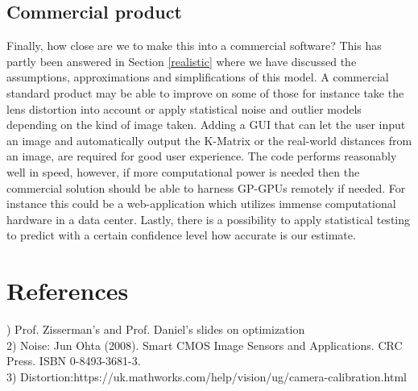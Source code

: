 \documentclass[titlepage]{article}
\begin{document}
\subsection{Commercial product}
Finally, how close are we to make this into a commercial software? This has partly been answered in Section \ref{realistic} where we have discussed the assumptions, approximations and simplifications of this model. A commercial standard product may be able to improve on some of those for instance take the lens distortion into account or apply statistical noise and outlier models depending on the kind of image taken. Adding a GUI that can let the user input an image and automatically output the K-Matrix or the real-world distances from an image, are required for good user experience. The code performs reasonably well in speed, however, if more computational power is needed then the commercial solution should be able to harness GP-GPUs remotely if needed. For instance this could be a web-application which utilizes immense computational hardware in a data center. Lastly, there is a possibility to apply statistical testing to predict with a certain confidence level how accurate is our estimate.
\section{References}) Prof. Zisserman's and Prof. Daniel's slides on optimization\\
2) Noise: Jun Ohta (2008). Smart CMOS Image Sensors and Applications. CRC Press. ISBN 0-8493-3681-3.\\
3) Distortion:https://uk.mathworks.com/help/vision/ug/camera-calibration.html
\end{document}
